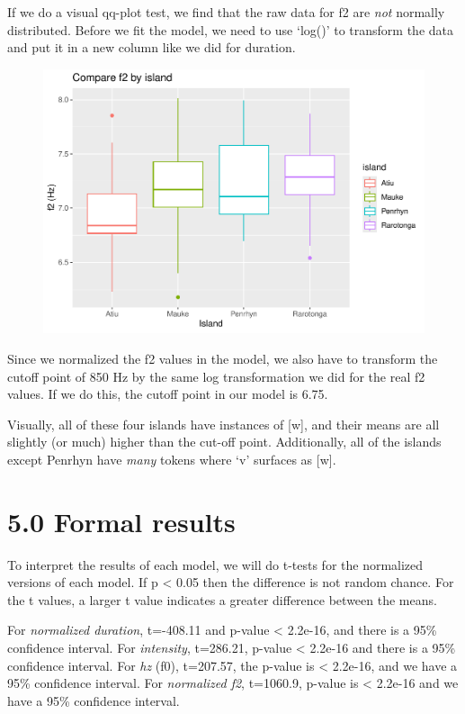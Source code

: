 \documentclass[
  ,man,floatsintext]{apa6}
\begin{document}
If we do a visual qq-plot test, we find that the raw data for f2 are \emph{not} normally distributed. Before we fit the model, we need to use `log()' to transform the data and put it in a new column like we did for duration.

\begin{figure}
\includegraphics[width=0.75\linewidth]{cim_w_v_manuscript_files/figure-latex/print-plot-f2-1} \caption{ }\label{fig:print-plot-f2}
\end{figure}

Since we normalized the f2 values in the model, we also have to transform the cutoff point of 850 Hz by the same log transformation we did for the real f2 values. If we do this, the cutoff point in our model is 6.75.

Visually, all of these four islands have instances of {[}w{]}, and their means are all slightly (or much) higher than the cut-off point. Additionally, all of the islands except Penrhyn have \emph{many} tokens where `v' surfaces as {[}w{]}.

\section{5.0 Formal results}\label{formal-results}

To interpret the results of each model, we will do t-tests for the normalized versions of each model. If p \textless{} 0.05 then the difference is not random chance. For the t values, a larger t value indicates a greater difference between the means.

For \emph{normalized duration}, t=-408.11 and p-value \textless{} 2.2e-16, and there is a 95\% confidence interval. For \emph{intensity}, t=286.21, p-value \textless{} 2.2e-16 and there is a 95\% confidence interval. For \emph{hz} (f0), t=207.57, the p-value is \textless{} 2.2e-16, and we have a 95\% confidence interval. For \emph{normalized f2}, t=1060.9, p-value is \textless{} 2.2e-16 and we have a 95\% confidence interval.
\end{document}
